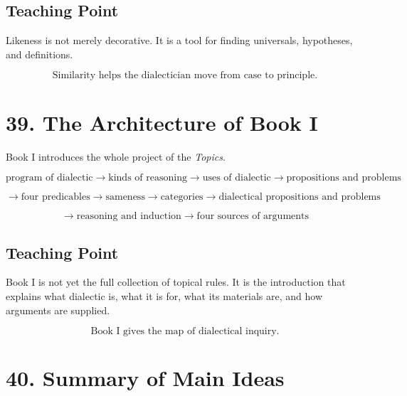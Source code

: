 \documentclass[12pt]{article}
\begin{document}
\subsection*{Teaching Point}

Likeness is not merely decorative. It is a tool for finding universals,
hypotheses, and definitions.

\[
\boxed{
\text{Similarity helps the dialectician move from case to principle.}
}
\]

\section*{39. The Architecture of Book I}

Book I introduces the whole project of the \textit{Topics}.

\[
\text{program of dialectic}
\rightarrow
\text{kinds of reasoning}
\rightarrow
\text{uses of dialectic}
\rightarrow
\text{propositions and problems}
\]

\[
\rightarrow
\text{four predicables}
\rightarrow
\text{sameness}
\rightarrow
\text{categories}
\rightarrow
\text{dialectical propositions and problems}
\]

\[
\rightarrow
\text{reasoning and induction}
\rightarrow
\text{four sources of arguments}
\]

\subsection*{Teaching Point}

Book I is not yet the full collection of topical rules. It is the introduction
that explains what dialectic is, what it is for, what its materials are, and how
arguments are supplied.

\[
\boxed{
\text{Book I gives the map of dialectical inquiry.}
}
\]

\section*{40. Summary of Main Ideas}
\end{document}
